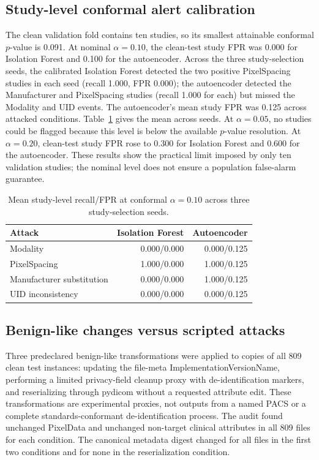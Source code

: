 \documentclass[journal]{IEEEtran}
\begin{document}
  \subsection{Study-level conformal alert calibration}
  The clean validation fold contains ten studies, so its smallest attainable conformal $p$-value is 0.091. At nominal $\alpha=0.10$, the clean-test study FPR was 0.000 for Isolation Forest and 0.100 for the autoencoder. Across the three study-selection seeds, the calibrated Isolation Forest detected the two positive PixelSpacing studies in each seed (recall 1.000, FPR 0.000); the autoencoder detected the Manufacturer and PixelSpacing studies (recall 1.000 for each) but missed the Modality and UID events. The autoencoder's mean study FPR was 0.125 across attacked conditions. Table~\ref{tab:conformal_study} gives the mean across seeds. At $\alpha=0.05$, no studies could be flagged because this level is below the available $p$-value resolution. At $\alpha=0.20$, clean-test study FPR rose to 0.300 for Isolation Forest and 0.600 for the autoencoder. These results show the practical limit imposed by only ten validation studies; the nominal level does not ensure a population false-alarm guarantee.
  
  \begin{table}[t]
  \caption{Mean study-level recall/FPR at conformal $\alpha=0.10$ across three study-selection seeds.}
  \label{tab:conformal_study}
  \centering\scriptsize
  \begin{tabular}{lrr}
  \toprule
  Attack & Isolation Forest & Autoencoder \\
  \midrule
  Modality & 0.000/0.000 & 0.000/0.125 \\
  PixelSpacing & 1.000/0.000 & 1.000/0.125 \\
  Manufacturer substitution & 0.000/0.000 & 1.000/0.125 \\
  UID inconsistency & 0.000/0.000 & 0.000/0.125 \\
  \bottomrule
  \end{tabular}
  \end{table}
  
  \subsection{Benign-like changes versus scripted attacks}
  Three predeclared benign-like transformations were applied to copies of all 809 clean test instances: updating the file-meta ImplementationVersionName, performing a limited privacy-field cleanup proxy with de-identification markers, and reserializing through pydicom without a requested attribute edit. These transformations are experimental proxies, not outputs from a named PACS or a complete standards-conformant de-identification process. The audit found unchanged PixelData and unchanged non-target clinical attributes in all 809 files for each condition. The canonical metadata digest changed for all files in the first two conditions and for none in the reserialization condition.
  
\end{document}
